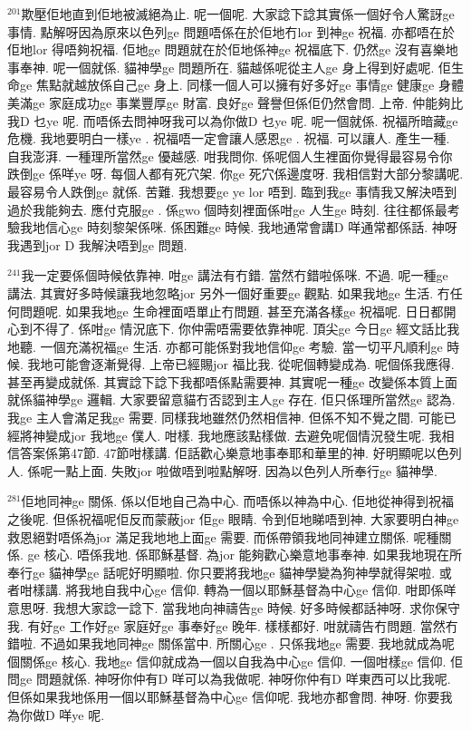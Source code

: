\documentclass{book}
\begin{document}
$^{201}$欺壓佢地直到佢地被滅絕為止.
呢一個呢.
大家諗下諗其實係一個好令人驚訝ge 事情.
點解呀因為原來以色列ge 問題唔係在於佢地冇lor 到神ge 祝福.
亦都唔在於佢地lor 得唔夠祝福.
佢地ge 問題就在於佢地係神ge 祝福底下.
仍然ge 沒有喜樂地事奉神.
呢一個就係.
貓神學ge 問題所在.
貓越係呢從主人ge 身上得到好處呢.
佢生命ge 焦點就越放係自己ge 身上.
同樣一個人可以擁有好多好ge 事情ge 健康ge 身體美滿ge 家庭成功ge 事業豐厚ge 財富.
良好ge 聲譽但係佢仍然會問.
上帝.
仲能夠比我D 乜ye 呢.
而唔係去問神呀我可以為你做D 乜ye 呢.
呢一個就係.
祝福所暗藏ge 危機.
我地要明白一樣ye .
祝福唔一定會讓人感恩ge .
祝福.
可以讓人.
產生一種.
自我澎湃.
一種理所當然ge 優越感.
咁我問你.
係呢個人生裡面你覺得最容易令你跌倒ge 係咩ye 呀.
每個人都有死穴架.
你ge 死穴係邊度呀.
我相信對大部分黎講呢.
最容易令人跌倒ge 就係.
苦難.
我想要ge ye lor 唔到.
臨到我ge 事情我又解決唔到過於我能夠去.
應付克服ge .
係gwo 個時刻裡面係咁ge 人生ge 時刻.
往往都係最考驗我地信心ge 時刻黎架係咪.
係困難ge 時候.
我地通常會講D 咩通常都係話.
神呀我遇到jor D 我解決唔到ge 問題.

$^{241}$我一定要係個時候依靠神.
咁ge 講法有冇錯.
當然冇錯啦係咪.
不過.
呢一種ge 講法.
其實好多時候讓我地忽略jor 另外一個好重要ge 觀點.
如果我地ge 生活.
冇任何問題呢.
如果我地ge 生命裡面唔單止冇問題.
甚至充滿各樣ge 祝福呢.
日日都開心到不得了.
係咁ge 情況底下.
你仲需唔需要依靠神呢.
頂尖ge 今日ge 經文話比我地聽.
一個充滿祝福ge 生活.
亦都可能係對我地信仰ge 考驗.
當一切平凡順利ge 時候.
我地可能會逐漸覺得.
上帝已經賜jor 福比我.
從呢個轉變成為.
呢個係我應得.
甚至再變成就係.
其實諗下諗下我都唔係點需要神.
其實呢一種ge 改變係本質上面就係貓神學ge 邏輯.
大家要留意貓冇否認到主人ge 存在.
佢只係理所當然ge 認為.
我ge 主人會滿足我ge 需要.
同樣我地雖然仍然相信神.
但係不知不覺之間.
可能已經將神變成jor 我地ge 僕人.
咁樣.
我地應該點樣做.
去避免呢個情況發生呢.
我相信答案係第47節.
47節咁樣講.
佢話歡心樂意地事奉耶和華里的神.
好明顯呢以色列人.
係呢一點上面.
失敗jor 啦做唔到啦點解呀.
因為以色列人所奉行ge 貓神學.

$^{281}$佢地同神ge 關係.
係以佢地自己為中心.
而唔係以神為中心.
佢地從神得到祝福之後呢.
但係祝福呢佢反而蒙蔽jor 佢ge 眼睛.
令到佢地睇唔到神.
大家要明白神ge 救恩絕對唔係為jor 滿足我地地上面ge 需要.
而係帶領我地同神建立關係.
呢種關係.
ge 核心.
唔係我地.
係耶穌基督.
為jor 能夠歡心樂意地事奉神.
如果我地現在所奉行ge 貓神學ge 話呢好明顯啦.
你只要將我地ge 貓神學變為狗神學就得架啦.
或者咁樣講.
將我地自我中心ge 信仰.
轉為一個以耶穌基督為中心ge 信仰.
咁即係咩意思呀.
我想大家諗一諗下.
當我地向神禱告ge 時候.
好多時候都話神呀.
求你保守我.
有好ge 工作好ge 家庭好ge 事奉好ge 晚年.
樣樣都好.
咁就禱告冇問題.
當然冇錯啦.
不過如果我地同神ge 關係當中.
所關心ge .
只係我地ge 需要.
我地就成為呢個關係ge 核心.
我地ge 信仰就成為一個以自我為中心ge 信仰.
一個咁樣ge 信仰.
佢問ge 問題就係.
神呀你仲有D 咩可以為我做呢.
神呀你仲有D 咩東西可以比我呢.
但係如果我地係用一個以耶穌基督為中心ge 信仰呢.
我地亦都會問.
神呀.
你要我為你做D 咩ye 呢.
\end{document}
